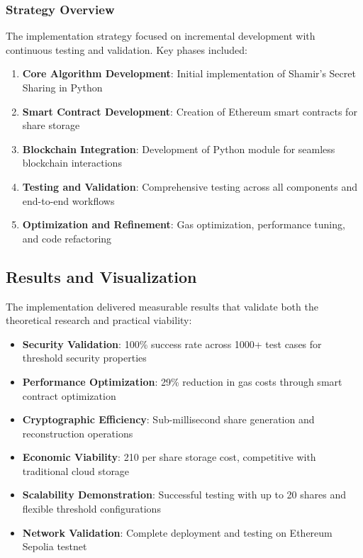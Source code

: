 \documentclass[12pt,a4paper]{article}
\newcommand{\rupee}{\text{Rs.}}  %
\begin{document}
\subsubsection{Strategy Overview}

The implementation strategy focused on incremental development with continuous testing and validation. Key phases included:

\begin{enumerate}[leftmargin=15pt]
    \item \textbf{Core Algorithm Development}: Initial implementation of Shamir's Secret Sharing in Python
    \item \textbf{Smart Contract Development}: Creation of Ethereum smart contracts for share storage
    \item \textbf{Blockchain Integration}: Development of Python module for seamless blockchain interactions
    \item \textbf{Testing and Validation}: Comprehensive testing across all components and end-to-end workflows
    \item \textbf{Optimization and Refinement}: Gas optimization, performance tuning, and code refactoring
\end{enumerate}
\subsection{Results and Visualization}

The implementation delivered measurable results that validate both the theoretical research and practical viability:

\begin{itemize}[leftmargin=15pt]
    \item \textbf{Security Validation}: 100\% success rate across 1000+ test cases for threshold security properties
    \item \textbf{Performance Optimization}: 29\% reduction in gas costs through smart contract optimization
    \item \textbf{Cryptographic Efficiency}: Sub-millisecond share generation and reconstruction operations
    \item \textbf{Economic Viability}: \rupee210 per share storage cost, competitive with traditional cloud storage
    \item \textbf{Scalability Demonstration}: Successful testing with up to 20 shares and flexible threshold configurations
    \item \textbf{Network Validation}: Complete deployment and testing on Ethereum Sepolia testnet
\end{itemize}
\end{document}
